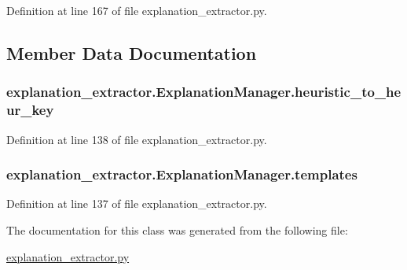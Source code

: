 Definition at line 167 of file explanation\+\_\+extractor.\+py.



\subsection{Member Data Documentation}
\hypertarget{classexplanation__extractor_1_1_explanation_manager_ad528733dbb33f6d033a3ee7738bfe91e}{}
\subsubsection[{heuristic\+\_\+to\+\_\+heur\+\_\+key}]{\setlength{\rightskip}{0pt plus 5cm}explanation\+\_\+extractor.\+Explanation\+Manager.\+heuristic\+\_\+to\+\_\+heur\+\_\+key}\label{classexplanation__extractor_1_1_explanation_manager_ad528733dbb33f6d033a3ee7738bfe91e}


Definition at line 138 of file explanation\+\_\+extractor.\+py.

\hypertarget{classexplanation__extractor_1_1_explanation_manager_a721b8077c8e3704a56e19de566f9dbda}{}
\subsubsection[{templates}]{\setlength{\rightskip}{0pt plus 5cm}explanation\+\_\+extractor.\+Explanation\+Manager.\+templates}\label{classexplanation__extractor_1_1_explanation_manager_a721b8077c8e3704a56e19de566f9dbda}


Definition at line 137 of file explanation\+\_\+extractor.\+py.



The documentation for this class was generated from the following file\+:\begin{DoxyCompactItemize}
\item 
\hyperlink{explanation__extractor_8py}{explanation\+\_\+extractor.\+py}\end{DoxyCompactItemize}
